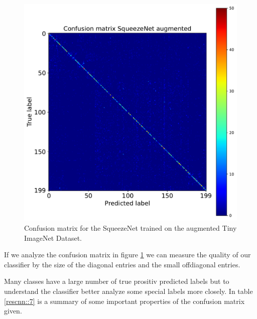 \documentclass[11pt]{article}
\begin{document}
\begin{figure}[h]
\centering
\includegraphics[width=0.5\columnwidth]{squeezeNet_TIN_aug_confmat.pdf}
\caption{Confusion matrix for the SqueezeNet trained on the augmented Tiny ImageNet Dataset.}
\label{rescnn::6}
\end{figure}

If we analyze the confusion matrix in figure \ref{rescnn::6} we can measure the quality of our classifier by the size of the diagonal entries and the small offdiagonal entries. 

Many classes have a large number of true prositiv predicted labels but to understand the classifier better analyze some special labels more closely. In table \ref{rescnn::7} is a summary of some important properties of the confusion matrix given.
\end{document}
